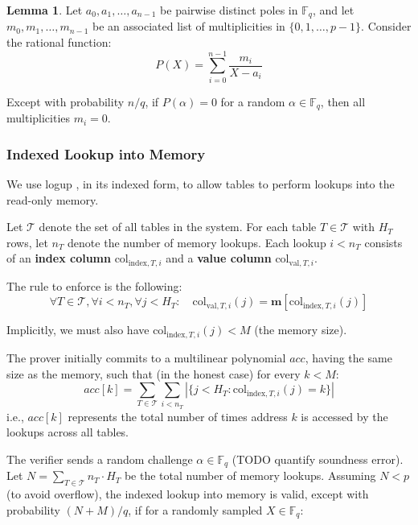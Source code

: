 \documentclass{article}
\theoremstyle{definition}
\newcommand{\Fq}{\mathbb F_q}
\newtheorem{lemma}{Lemma}
\begin{document}
\begin{lemma}
    Let $a_0, a_1, \ldots, a_{n-1}$ be pairwise distinct poles in $\Fq$, and let $m_0, m_1, \ldots, m_{n-1}$ be an associated list of multiplicities in $\{0, 1, \dots, p - 1\}$. Consider the rational function:
$$P(X) = \sum_{i=0}^{n-1} \frac{m_i}{X - a_i}$$

Except with probability $n/q$, if $P(\alpha) = 0$ for a random $\alpha \in \Fq$, then all multiplicities $m_i = 0$.

\end{lemma}

\subsubsection{Indexed Lookup into Memory}

We use logup \cite{logup}, in its indexed form, to allow tables to perform lookups into the read-only memory.


\vspace{3mm}

Let $\mathcal{T}$ denote the set of all tables in the system. For each table $T \in \mathcal{T}$ with $H_T$ rows, let $n_T$ denote the number of memory lookups. Each lookup $i < n_T$ consists of an \textbf{index column} $\text{col}_{\text{index},T,i}$ and a \textbf{value column} $\text{col}_{\text{val},T,i}$.

\vspace{3mm}

The rule to enforce is the following:
$$\forall T \in \mathcal{T}, \forall i < n_T, \forall j < H_T: \quad \text{col}_{\text{val},T,i}(j) = \textbf{m}[\text{col}_{\text{index},T,i}(j)]$$

Implicitly, we must also have $\text{col}_{\text{index},T,i}(j) < M$ (the memory size).

\vspace{3mm}

The prover initially commits to a multilinear polynomial $\textit{acc}$, having the same size as the memory, such that (in the honest case) for every $k < M$:
$$\textit{acc}[k] = \sum_{T \in \mathcal{T}} \sum_{i < n_T} \left| \{ j < H_T : \text{col}_{\text{index},T,i}(j) = k \} \right|$$
i.e., $\textit{acc}[k]$ represents the total number of times address $k$ is accessed by the lookups across all tables.

\vspace{3mm}

The verifier sends a random challenge $\alpha \in \Fq$ (TODO quantify soundness error). Let $N = \sum_{T \in \mathcal{T}} n_T \cdot H_T$ be the total number of memory lookups. Assuming $N < p$ (to avoid overflow), the indexed lookup into memory is valid, except with probability $(N + M)/q$, if for a randomly sampled $X \in \Fq$:
\end{document}

